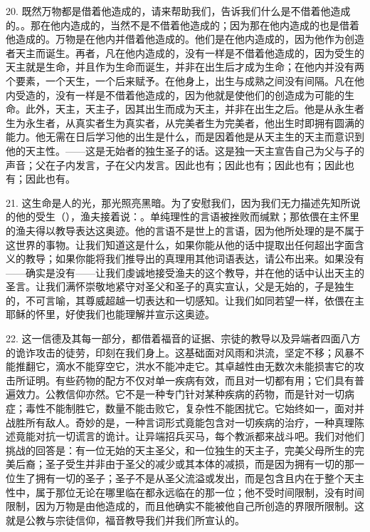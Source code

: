 20. 既然万物都是借着他造成的，请来帮助我们，告诉我们什么是不借着他造成的。。那在他内造成的，当然不是不借着他造成的；因为那在他内造成的也是借着他造成的。万物是在他内并借着他造成的。他们是在他内造成的，因为他作为创造者天主而诞生。再者，凡在他内造成的，没有一样是不借着他造成的，因为受生的天主就是生命，并且作为生命而诞生，并非在出生后才成为生命；在他内并没有两个要素，一个天生，一个后来赋予。在他身上，出生与成熟之间没有间隔。凡在他内受造的，没有一样是不借着他造成的，因为他就是使他们的创造成为可能的生命。此外，天主，天主子，因其出生而成为天主，并非在出生之后。他是从永生者生为永生者，从真实者生为真实者，从完美者生为完美者，他出生时即拥有圆满的能力。他无需在日后学习他的出生是什么，而是因着他是从天主生的天主而意识到他的天主性。——这是无始者的独生圣子的话。这是独一天主宣告自己为父与子的声音；父在子内发言，子在父内发言。因此也有；因此也有；因此也有；因此也有；因此也有。\par

21. 这生命是人的光，那光照亮黑暗。为了安慰我们，因为我们无力描述先知所说的他的受生（），渔夫接着说：。单纯理性的言语被挫败而缄默；那依偎在主怀里的渔夫得以教导表达这奥迹。他的言语不是世上的言语，因为他所处理的是不属于这世界的事物。让我们知道这是什么，如果你能从他的话中提取出任何超出字面含义的教导；如果你能将我们推导出的真理用其他词语表达，请公布出来。如果没有——确实是没有——让我们虔诚地接受渔夫的这个教导，并在他的话中认出天主的圣言。让我们满怀崇敬地紧守对圣父和圣子的真实宣认，父是无始的，子是独生的，不可言喻，其尊威超越一切表达和一切感知。让我们如同若望一样，依偎在主耶稣的怀里，好使我们也能理解并宣示这奥迹。\par

22. 这一信德及其每一部分，都借着福音的证据、宗徒的教导以及异端者四面八方的诡诈攻击的徒劳，印刻在我们身上。这基础面对风雨和洪流，坚定不移；风暴不能推翻它，滴水不能穿空它，洪水不能冲走它。其卓越性由无数次未能损害它的攻击所证明。有些药物的配方不仅对单一疾病有效，而且对一切都有用；它们具有普遍效力。公教信仰亦然。它不是一种专门针对某种疾病的药物，而是针对一切病症；毒性不能制胜它，数量不能击败它，复杂性不能困扰它。它始终如一，面对并战胜所有敌人。奇妙的是，一种言词形式竟能包含对一切疾病的治疗，一种真理陈述竟能对抗一切谎言的诡计。让异端招兵买马，每个教派都来战斗吧。我们对他们挑战的回答是：有一位无始的天主圣父，和一位独生的天主子，完美父母所生的完美后裔；圣子受生并非由于圣父的减少或其本体的减损，而是因为拥有一切的那一位生了拥有一切的圣子；圣子不是从圣父流溢或发出，而是包含且内在于整个天主性中，属于那位无论在哪里临在都永远临在的那一位；他不受时间限制，没有时间限制，因为万物是由他造成的，而且他确实不能被他自己所创造的界限所限制。这就是公教与宗徒信仰，福音教导我们并我们所宣认的。\par

